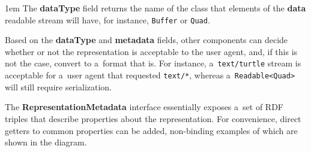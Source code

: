 \documentclass[10pt]{article}
\newenvironment{Note}
  {\begin{multicols}{3}%
     \parskip 1em}
  {\end{multicols}}
\begin{document}
\bigskip


\bigskip

\begin{Note}
The \textbf{dataType} field returns the name of the class
that elements of the \textbf{data} readable stream will have,
for instance,
\verb!Buffer! or \verb!Quad!.
\columnbreak

Based on the \textbf{dataType} and \textbf{metadata} fields,
other components can decide whether or not the representation
is acceptable to the user agent,
and, if this is not the case,
convert to a~format that is.
For instance,
a~\verb!text/turtle! stream is acceptable
for a~user agent that requested \verb!text/*!,
whereas a~\verb!Readable<Quad>! will still require serialization.

\columnbreak
The \textbf{RepresentationMetadata} interface
essentially exposes a~set of RDF triples
that describe properties about the representation.
For convenience,
direct getters to common properties can be added,
non-binding examples of which are shown in the diagram.

\end{Note}
\end{document}
